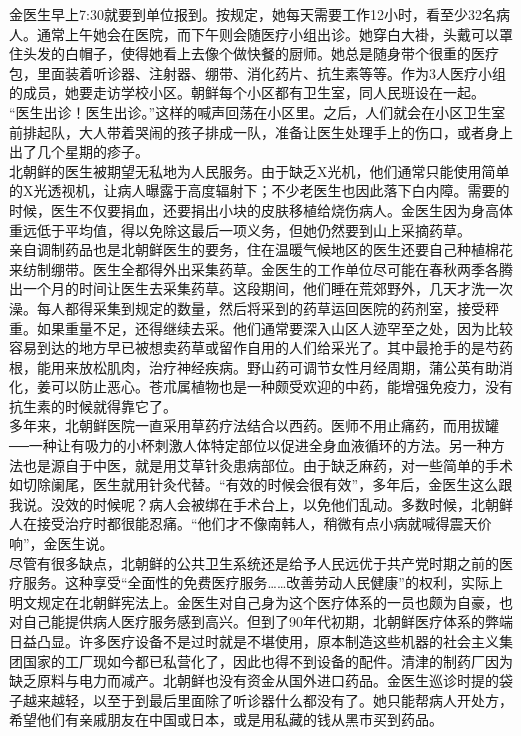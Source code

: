 金医生早上7:30就要到单位报到。按规定，她每天需要工作12小时，看至少32名病人。通常上午她会在医院，而下午则会随医疗小组出诊。她穿白大褂，头戴可以罩住头发的白帽子，使得她看上去像个做快餐的厨师。她总是随身带个很重的医疗包，里面装着听诊器、注射器、绷带、消化药片、抗生素等等。作为3人医疗小组的成员，她要走访学校小区。朝鲜每个小区都有卫生室，同人民班设在一起。\\

“医生出诊！医生出诊。”这样的喊声回荡在小区里。之后，人们就会在小区卫生室前排起队，大人带着哭闹的孩子排成一队，准备让医生处理手上的伤口，或者身上出了几个星期的疹子。\\

北朝鲜的医生被期望无私地为人民服务。由于缺乏X光机，他们通常只能使用简单的X光透视机，让病人曝露于高度辐射下；不少老医生也因此落下白内障。需要的时候，医生不仅要捐血，还要捐出小块的皮肤移植给烧伤病人。金医生因为身高体重远低于平均值，得以免除这最后一项义务，但她仍然要到山上采摘药草。\\

亲自调制药品也是北朝鲜医生的要务，住在温暖气候地区的医生还要自己种植棉花来纺制绷带。医生全都得外出采集药草。金医生的工作单位尽可能在春秋两季各腾出一个月的时间让医生去采集药草。这段期间，他们睡在荒郊野外，几天才洗一次澡。每人都得采集到规定的数量，然后将采到的药草运回医院的药剂室，接受秤重。如果重量不足，还得继续去采。他们通常要深入山区人迹罕至之处，因为比较容易到达的地方早已被想卖药草或留作自用的人们给采光了。其中最抢手的是芍药根，能用来放松肌肉，治疗神经疾病。野山药可调节女性月经周期，蒲公英有助消化，姜可以防止恶心。苍朮属植物也是一种颇受欢迎的中药，能增强免疫力，没有抗生素的时候就得靠它了。\\

多年来，北朝鲜医院一直采用草药疗法结合以西药。医师不用止痛药，而用拔罐──一种让有吸力的小杯刺激人体特定部位以促进全身血液循环的方法。另一种方法也是源自于中医，就是用艾草针灸患病部位。由于缺乏麻药，对一些简单的手术如切除阑尾，医生就用针灸代替。“有效的时候会很有效”，多年后，金医生这么跟我说。没效的时候呢？病人会被绑在手术台上，以免他们乱动。多数时候，北朝鲜人在接受治疗时都很能忍痛。“他们才不像南韩人，稍微有点小病就喊得震天价响”，金医生说。\\

尽管有很多缺点，北朝鲜的公共卫生系统还是给予人民远优于共产党时期之前的医疗服务。这种享受“全面性的免费医疗服务……改善劳动人民健康”的权利，实际上明文规定在北朝鲜宪法上。金医生对自己身为这个医疗体系的一员也颇为自豪，也对自己能提供病人医疗服务感到高兴。但到了90年代初期，北朝鲜医疗体系的弊端日益凸显。许多医疗设备不是过时就是不堪使用，原本制造这些机器的社会主义集团国家的工厂现如今都已私营化了，因此也得不到设备的配件。清津的制药厂因为缺乏原料与电力而减产。北朝鲜也没有资金从国外进口药品。金医生巡诊时提的袋子越来越轻，以至于到最后里面除了听诊器什么都没有了。她只能帮病人开处方，希望他们有亲戚朋友在中国或日本，或是用私藏的钱从黑市买到药品。\\

